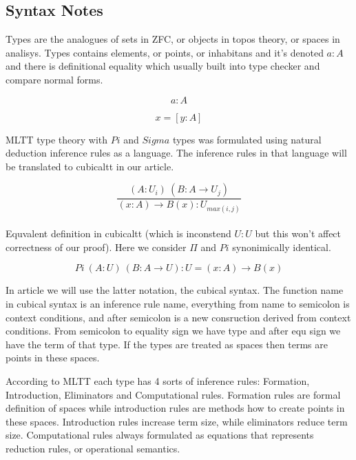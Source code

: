 \documentclass{svproc}
\begin{document}
\subsection{Syntax Notes}

Types are the analogues of sets in ZFC, or objects in topos theory, or spaces in analisys.
Types contains elements, or points, or inhabitans and it's denoted $a : A$ and there
is definitional equality which usually built into type checker and compare normal forms.

\begin{equation}
\tag{terms and types}
a : A
\end{equation}

\begin{equation}
\tag{definitional equality}
x = [ y : A ]
\end{equation}

MLTT type theory with $Pi$ and $Sigma$ types was formulated using
natural deduction inference rules as a language.
The inference rules in that language will
be translated to cubicaltt in our article.

\begin{equation}
\tag{natural deduction}
\dfrac
{(A: U_i)\ (B: A \rightarrow U_j)}
{(x: A) \rightarrow B(x): U_{max(i,j)}}
\end{equation}
\\
Equvalent definition in cubicaltt (which is inconstend $U : U$ but
this won't affect correctness of our proof). Here we consider $\Pi$
and $Pi$ synonimically identical. 

\begin{equation}
\tag{cubicaltt}
Pi\ (A: U)\ (B: A \rightarrow U): U = (x: A) \rightarrow B(x)
\end{equation}

In article we will use the latter notation, the cubical syntax.
The function name in cubical syntax is an inference rule name,
everything from name to semicolon is context conditions,
and after semicolon is a new consruction derived from context conditions.
From semicolon to equality sign we have type and after
equ sign we have the term of that type.
If the types are treated as spaces then terms are points in these spaces.

According to MLTT each type has 4 sorts of inference rules:
Formation, Introduction, Eliminators and Computational rules.
Formation rules are formal definition of spaces while introduction rules
are methods how to create points in these spaces. Introduction rules increase term size,
while eliminators reduce term size. Computational rules always
formulated as equations that represents reduction rules,
or operational semantics.
\end{document}
